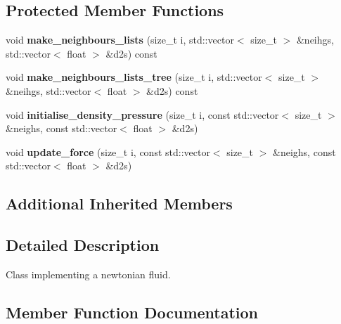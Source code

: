 \subsection*{Protected Member Functions}
\begin{DoxyCompactItemize}
\item 
\mbox{\label{classphysim_1_1fluids_1_1newtonian_a287169d21b4555aa9bf0d054bfe8211c}} 
void {\bfseries make\+\_\+neighbours\+\_\+lists} (size\+\_\+t i, std\+::vector$<$ size\+\_\+t $>$ \&neihgs, std\+::vector$<$ float $>$ \&d2s) const
\item 
\mbox{\label{classphysim_1_1fluids_1_1newtonian_ac8fff5dc5cfc6ec210abf0976665ea9c}} 
void {\bfseries make\+\_\+neighbours\+\_\+lists\+\_\+tree} (size\+\_\+t i, std\+::vector$<$ size\+\_\+t $>$ \&neihgs, std\+::vector$<$ float $>$ \&d2s) const
\item 
\mbox{\label{classphysim_1_1fluids_1_1newtonian_a4509ea52228c2f5522737f837a3dab9c}} 
void {\bfseries initialise\+\_\+density\+\_\+pressure} (size\+\_\+t i, const std\+::vector$<$ size\+\_\+t $>$ \&neighs, const std\+::vector$<$ float $>$ \&d2s)
\item 
\mbox{\label{classphysim_1_1fluids_1_1newtonian_ab7e0981e546a230f8f4039160e3be6db}} 
void {\bfseries update\+\_\+force} (size\+\_\+t i, const std\+::vector$<$ size\+\_\+t $>$ \&neighs, const std\+::vector$<$ float $>$ \&d2s)
\end{DoxyCompactItemize}
\subsection*{Additional Inherited Members}


\subsection{Detailed Description}
Class implementing a newtonian fluid. 

\subsection{Member Function Documentation}
\mbox{\label{classphysim_1_1fluids_1_1newtonian_accfe7d69d2d3985e8ec8c8179a6cf5ba}} 
